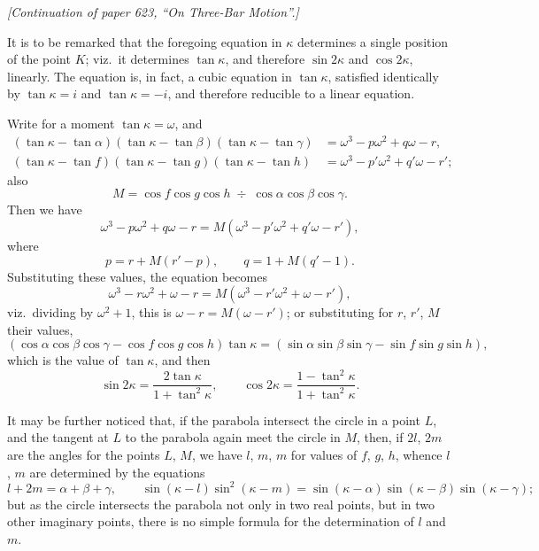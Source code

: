 \documentclass[11pt]{article}
\begin{document}

\noindent\textit{[Continuation of paper 623, ``On Three-Bar Motion''.]}

\bigskip

It is to be remarked that the foregoing equation in $\kappa$ determines a single position of the point $K$; viz.\ it determines $\tan\kappa$, and therefore $\sin 2\kappa$ and $\cos 2\kappa$, linearly. The equation is, in fact, a cubic equation in $\tan\kappa$, satisfied identically by $\tan\kappa = i$ and $\tan\kappa = -i$, and therefore reducible to a linear equation.

Write for a moment $\tan\kappa = \omega$, and
\begin{align*}
(\tan\kappa - \tan\alpha)(\tan\kappa - \tan\beta)(\tan\kappa - \tan\gamma) &= \omega^3 - p\omega^2 + q\omega - r,\\
(\tan\kappa - \tan f)(\tan\kappa - \tan g)(\tan\kappa - \tan h) &= \omega^3 - p'\omega^2 + q'\omega - r';
\end{align*}
also
\[
M = \cos f \cos g \cos h \;\div\; \cos\alpha\cos\beta\cos\gamma.
\]
Then we have
\[
\omega^3 - p\omega^2 + q\omega - r = M(\omega^3 - p'\omega^2 + q'\omega - r'),
\]
where
\[
p = r + M(r' - p),\qquad q = 1 + M(q' - 1).
\]
Substituting these values, the equation becomes
\[
\omega^3 - r\omega^2 + \omega - r = M(\omega^3 - r'\omega^2 + \omega - r'),
\]
viz.\ dividing by $\omega^2 + 1$, this is $\omega - r = M(\omega - r')$; or substituting for $r$, $r'$, $M$ their values,
\[
(\cos\alpha\cos\beta\cos\gamma - \cos f \cos g \cos h)\tan\kappa = (\sin\alpha\sin\beta\sin\gamma - \sin f \sin g \sin h),
\]
which is the value of $\tan\kappa$, and then
\[
\sin 2\kappa = \frac{2\tan\kappa}{1 + \tan^2\kappa},\qquad \cos 2\kappa = \frac{1 - \tan^2\kappa}{1 + \tan^2\kappa}.
\]

It may be further noticed that, if the parabola intersect the circle in a point $L$, and the tangent at $L$ to the parabola again meet the circle in $M$, then, if $2l$, $2m$ are the angles for the points $L$, $M$, we have $l$, $m$, $m$ for values of $f$, $g$, $h$, whence $l$, $m$ are determined by the equations
\[
l + 2m = \alpha + \beta + \gamma,\qquad \sin(\kappa - l)\sin^2(\kappa - m) = \sin(\kappa - \alpha)\sin(\kappa - \beta)\sin(\kappa - \gamma);
\]
but as the circle intersects the parabola not only in two real points, but in two other imaginary points, there is no simple formula for the determination of $l$ and $m$.
\end{document}
